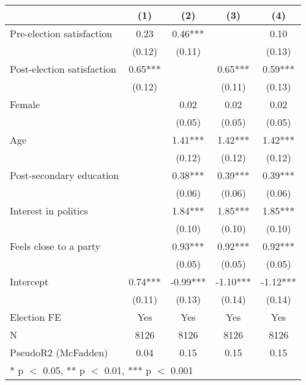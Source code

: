 \begin{tabular}[t]{lcccc}
\toprule
  & (1) & (2) & (3) & (4)\\
\midrule
Pre-election satisfaction & 0.23 & 0.46*** &  & 0.10\\
 & (0.12) & (0.11) &  & (0.13)\\
Post-election satisfaction & 0.65*** &  & 0.65*** & 0.59***\\
 & (0.12) &  & (0.11) & (0.13)\\
Female &  & 0.02 & 0.02 & 0.02\\
 &  & (0.05) & (0.05) & \vphantom{1} (0.05)\\
Age &  & 1.41*** & 1.42*** & 1.42***\\
 &  & (0.12) & (0.12) & (0.12)\\
Post-secondary education &  & 0.38*** & 0.39*** & 0.39***\\
 &  & (0.06) & (0.06) & (0.06)\\
Interest in politics &  & 1.84*** & 1.85*** & 1.85***\\
 &  & (0.10) & (0.10) & (0.10)\\
Feels close to a party &  & 0.93*** & 0.92*** & 0.92***\\
 &  & (0.05) & (0.05) & (0.05)\\
Intercept & 0.74*** & -0.99*** & -1.10*** & -1.12***\\
 & (0.11) & (0.13) & (0.14) & (0.14)\\
Election FE & Yes & Yes & Yes & Yes\\
\midrule
N & 8126 & 8126 & 8126 & 8126\\
PseudoR2 (McFadden) & 0.04 & 0.15 & 0.15 & 0.15\\
\bottomrule
\multicolumn{5}{l}{\rule{0pt}{1em}* p $<$ 0.05, ** p $<$ 0.01, *** p $<$ 0.001}\\
\end{tabular}
